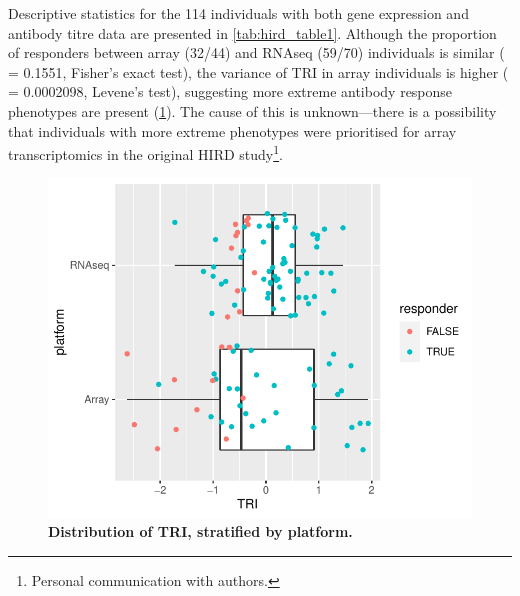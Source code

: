 Descriptive statistics for the 114 individuals with both gene expression and antibody titre data are presented in \cref{tab:hird_table1}.
Although the proportion of responders between array (32/44) and \gls{RNAseq} (59/70) individuals is similar (\pvalue{} = \num{0.1551}, Fisher's exact test), the variance of \gls{TRI} in array individuals is higher (\pvalue{} = \num[scientific-notation=true]{0.0002098}, Levene's test), suggesting more extreme antibody response phenotypes are present (\cref{fig:hird_phenotypes_by_platform}).
The cause of this is unknown---there is a possibility that individuals with more extreme phenotypes were prioritised for array transcriptomics in the original \gls{HIRD} study\footnote{Personal communication with \textcite{sobolev2016AdjuvantedInfluenzaH1N1Vaccination} authors.}.



\begin{figure}
    \includegraphics[width=1.0\textwidth,page=1]{mainmatter/figures/chapter_02/compare_phenotype_by_platform.pheno_boxplots.pdf}
    \caption{\textbf{Distribution of \gls{TRI}, stratified by platform.}}
    \label{fig:hird_phenotypes_by_platform}
\end{figure}

